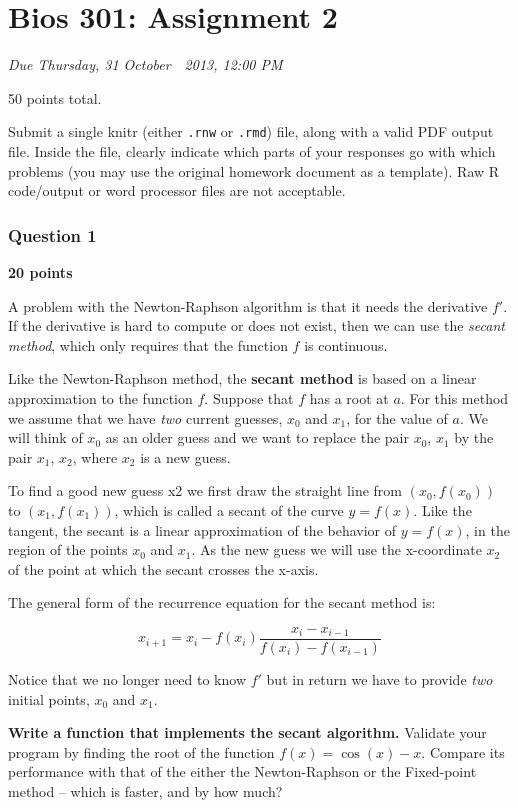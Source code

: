 \documentclass[]{article}
\author{}
\date{}
\begin{document}
\section{Bios 301: Assignment 2}

\emph{Due Thursday, 31 October 👻 2013, 12:00 PM}

50 points total.

Submit a single knitr (either \texttt{.rnw} or \texttt{.rmd}) file,
along with a valid PDF output file. Inside the file, clearly indicate
which parts of your responses go with which problems (you may use the
original homework document as a template). Raw R code/output or word
processor files are not acceptable.

\subsubsection{Question 1}

\textbf{20 points}

A problem with the Newton-Raphson algorithm is that it needs the
derivative $f′$. If the derivative is hard to compute or does not exist,
then we can use the \emph{secant method}, which only requires that the
function $f$ is continuous.

Like the Newton-Raphson method, the \textbf{secant method} is based on a
linear approximation to the function $f$. Suppose that $f$ has a root at
$a$. For this method we assume that we have \emph{two} current guesses,
$x_0$ and $x_1$, for the value of $a$. We will think of $x_0$ as an
older guess and we want to replace the pair $x_0$, $x_1$ by the pair
$x_1$, $x_2$, where $x_2$ is a new guess.

To find a good new guess x2 we first draw the straight line from
$(x_0,f(x_0))$ to $(x_1,f(x_1))$, which is called a secant of the curve
$y = f(x)$. Like the tangent, the secant is a linear approximation of
the behavior of $y = f(x)$, in the region of the points $x_0$ and $x_1$.
As the new guess we will use the x-coordinate $x_2$ of the point at
which the secant crosses the x-axis.

The general form of the recurrence equation for the secant method is:

\[x_{i+1} = x_i - f(x_i)\frac{x_i - x_{i-1}}{f(x_i) - f(x_{i-1})}\]

Notice that we no longer need to know $f′$ but in return we have to
provide \emph{two} initial points, $x_0$ and $x_1$.

\textbf{Write a function that implements the secant algorithm.} Validate
your program by finding the root of the function $f(x) = \cos(x) - x$.
Compare its performance with that of the either the Newton-Raphson or
the Fixed-point method -- which is faster, and by how much?
\end{document}
